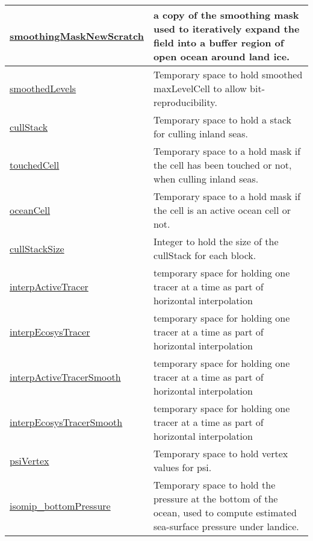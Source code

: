 {\begin{center}
\begin{longtable}{| p{2.0in} | p{4.0in} |}
    \hline
    \hyperref[subsec:var_sec_scratch_smoothingMaskNewScratch]{smoothingMaskNewScratch} & a copy of the smoothing mask used to iteratively expand the field into a buffer region of open ocean around land ice. \\
    \hline
    \hyperref[subsec:var_sec_scratch_smoothedLevels]{smoothedLevels} & Temporary space to hold smoothed maxLevelCell to allow bit-reproducibility. \\
    \hline
    \hyperref[subsec:var_sec_scratch_cullStack]{cullStack} & Temporary space to hold a stack for culling inland seas. \\
    \hline
    \hyperref[subsec:var_sec_scratch_touchedCell]{touchedCell} & Temporary space to a hold mask if the cell has been touched or not, when culling inland seas. \\
    \hline
    \hyperref[subsec:var_sec_scratch_oceanCell]{oceanCell} & Temporary space to a hold mask if the cell is an active ocean cell or not. \\
    \hline
    \hyperref[subsec:var_sec_scratch_cullStackSize]{cullStackSize} & Integer to hold the size of the cullStack for each block. \\
    \hline
    \hyperref[subsec:var_sec_scratch_interpActiveTracer]{interpActiveTracer} & temporary space for holding one tracer at a time as part of horizontal interpolation \\
    \hline
    \hyperref[subsec:var_sec_scratch_interpEcosysTracer]{interpEcosysTracer} & temporary space for holding one tracer at a time as part of horizontal interpolation \\
    \hline
    \hyperref[subsec:var_sec_scratch_interpActiveTracerSmooth]{interpActiveTracerSmooth} & temporary space for holding one tracer at a time as part of horizontal interpolation \\
    \hline
    \hyperref[subsec:var_sec_scratch_interpEcosysTracerSmooth]{interpEcosysTracerSmooth} & temporary space for holding one tracer at a time as part of horizontal interpolation \\
    \hline
    \hyperref[subsec:var_sec_scratch_psiVertex]{psiVertex} & Temporary space to hold vertex values for psi. \\
    \hline
    \hyperref[subsec:var_sec_scratch_isomip_bottomPressure]{isomip\_bottomPressure} & Temporary space to hold the pressure at the bottom of the ocean, used to compute estimated sea-surface pressure under landice. \\
    \hline
\end{longtable}
\end{center}
}
